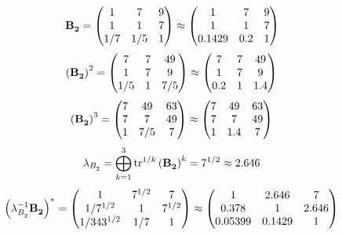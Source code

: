 \documentclass[10pt,a4paper]{article}
\begin{document}
	\[
		\bold{B_2^{}} = 
		\begin{pmatrix}
			{1}{} & {{7}}{} & {{9}}{} \\
			{1}{} & {1}{} & {{7}}{} \\
			{1} / {{7}} & {1} / {{5}} & {1}{} \\
		\end{pmatrix}
		\approx
		\begin{pmatrix}
			1        & 7        & 9        \\
			1        & 1        & 7        \\
			0.1429   & 0.2      & 1        \\
		\end{pmatrix}
	\]
	\[
		\left(\bold{B_2^{}}\right)^{2} = 
		\begin{pmatrix}
			{{7}}{} & {{7}}{} & {{49}}{} \\
			{1}{} & {{7}}{} & {{9}}{} \\
			{1} / {{5}} & {1}{} & {{7}} / {{5}} \\
		\end{pmatrix}
		\approx
		\begin{pmatrix}
			7        & 7        & 49       \\
			1        & 7        & 9        \\
			0.2      & 1        & 1.4      \\
		\end{pmatrix}
	\]
	\[
		\left(\bold{B_2^{}}\right)^{3} = 
		\begin{pmatrix}
			{{7}}{} & {{49}}{} & {{63}}{} \\
			{{7}}{} & {{7}}{} & {{49}}{} \\
			{1}{} & {{7}} / {{5}} & {{7}}{} \\
		\end{pmatrix}
		\approx
		\begin{pmatrix}
			7        & 49       & 63       \\
			7        & 7        & 49       \\
			1        & 1.4      & 7        \\
		\end{pmatrix}
	\]
	\[
		\lambda_{B_2^{}} =  \bigoplus ^{3} _{k = 1} \operatorname{tr} ^{1 / k} \left( \bold{B_2^{}} \right)^k = {{7^ {1 / 2}}}{}\approx 2.646
	\]
	\[
		\left(\lambda_{B_2^{}}^{-1}\bold{B_2^{}}\right)^* = 
		\begin{pmatrix}
			{1}{} & {{7^ {1 / 2}}}{} & {{7}}{} \\
			{1} / {{7^ {1 / 2}}} & {1}{} & {{7^ {1 / 2}}}{} \\
			{1} / {{343^ {1 / 2}}} & {1} / {{7}} & {1}{} \\
		\end{pmatrix}
		\approx
		\begin{pmatrix}
			1        & 2.646    & 7        \\
			0.378    & 1        & 2.646    \\
			0.05399  & 0.1429   & 1        \\
		\end{pmatrix}
	\]
\end{document}
